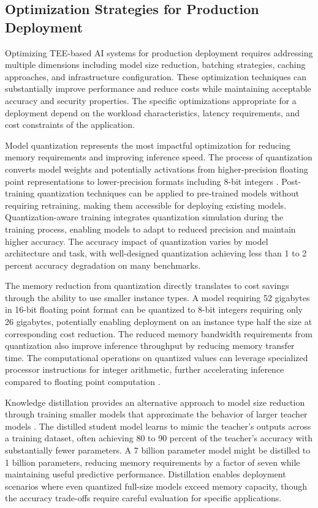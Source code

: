 \subsection{Optimization Strategies for Production Deployment}

Optimizing TEE-based AI systems for production deployment requires addressing multiple dimensions including model size reduction, batching strategies, caching approaches, and infrastructure configuration. These optimization techniques can substantially improve performance and reduce costs while maintaining acceptable accuracy and security properties. The specific optimizations appropriate for a deployment depend on the workload characteristics, latency requirements, and cost constraints of the application.

Model quantization represents the most impactful optimization for reducing memory requirements and improving inference speed. The process of quantization converts model weights and potentially activations from higher-precision floating point representations to lower-precision formats including 8-bit integers \cite{quantization_survey}. Post-training quantization techniques can be applied to pre-trained models without requiring retraining, making them accessible for deploying existing models. Quantization-aware training integrates quantization simulation during the training process, enabling models to adapt to reduced precision and maintain higher accuracy. The accuracy impact of quantization varies by model architecture and task, with well-designed quantization achieving less than 1 to 2 percent accuracy degradation on many benchmarks.

The memory reduction from quantization directly translates to cost savings through the ability to use smaller instance types. A model requiring 52 gigabytes in 16-bit floating point format can be quantized to 8-bit integers requiring only 26 gigabytes, potentially enabling deployment on an instance type half the size at corresponding cost reduction. The reduced memory bandwidth requirements from quantization also improve inference throughput by reducing memory transfer time. The computational operations on quantized values can leverage specialized processor instructions for integer arithmetic, further accelerating inference compared to floating point computation \cite{quantization_survey}.

Knowledge distillation provides an alternative approach to model size reduction through training smaller models that approximate the behavior of larger teacher models \cite{knowledge_distillation}. The distilled student model learns to mimic the teacher's outputs across a training dataset, often achieving 80 to 90 percent of the teacher's accuracy with substantially fewer parameters. A 7 billion parameter model might be distilled to 1 billion parameters, reducing memory requirements by a factor of seven while maintaining useful predictive performance. Distillation enables deployment scenarios where even quantized full-size models exceed memory capacity, though the accuracy trade-offs require careful evaluation for specific applications.

